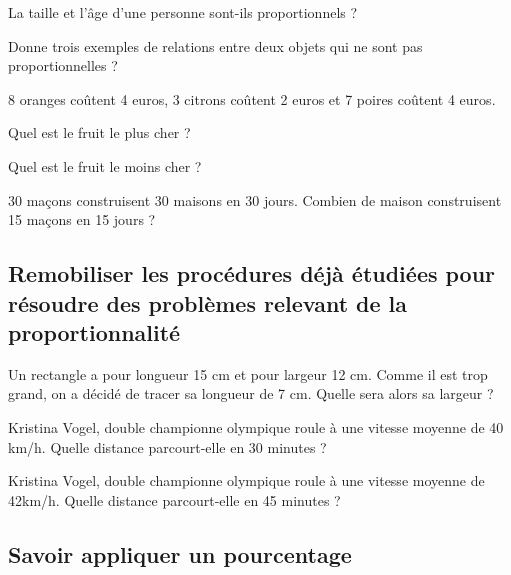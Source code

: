 
La taille et l'âge d'une personne sont-ils proportionnels ?

Donne trois exemples de relations entre deux objets qui ne sont pas proportionnelles ?



8 oranges coûtent 4 euros, 3 citrons coûtent 2 euros et 7 poires coûtent 4 euros.

\begin{description}
\item Quel est le fruit le plus cher ? 
\item Quel est le fruit le moins cher ?
\end{description}


30 maçons construisent 30 maisons en 30 jours. Combien de maison construisent 15 maçons en 15 jours ?




\subsection{Remobiliser les procédures déjà étudiées pour résoudre des problèmes relevant de la proportionnalité}



Un rectangle a pour longueur 15 cm et pour largeur 12 cm. Comme il est trop grand, on a décidé de tracer sa longueur de 7 cm. Quelle sera alors sa largeur ?




Kristina Vogel, double championne olympique roule à une vitesse moyenne de 40 km/h. Quelle distance parcourt-elle en 30 minutes ?






Kristina Vogel, double championne olympique roule à une vitesse moyenne de 42km/h. Quelle distance parcourt-elle en 45 minutes ?




\subsection{Savoir appliquer un pourcentage}


